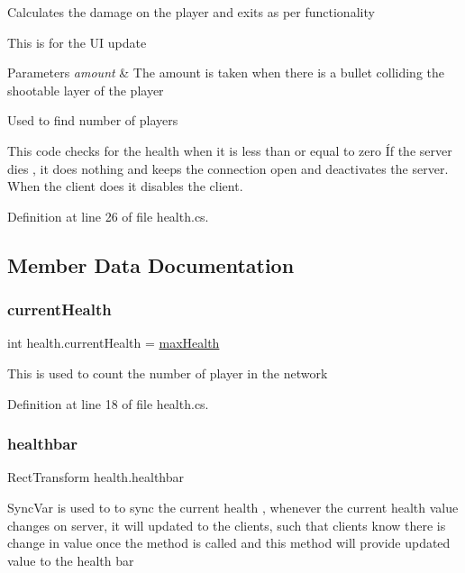 Calculates the damage on the player and exits as per functionality 

This is for the UI update 


\begin{DoxyParams}{Parameters}
{\em amount} & The amount is taken when there is a bullet colliding the shootable layer of the player\\
\hline
\end{DoxyParams}
Used to find number of players

This code checks for the health when it is less than or equal to zero Íf the server dies , it does nothing and keeps the connection open and deactivates the server. When the client does it disables the client. 

Definition at line 26 of file health.\+cs.



\subsection{Member Data Documentation}
\mbox{\label{classhealth_a50db37d3af48df3d68a1c7a415f7de53}} 
\subsubsection{\texorpdfstring{currentHealth}{currentHealth}}
{\footnotesize\ttfamily int health.\+current\+Health = \mbox{\hyperlink{classhealth_a03ad8e4011a7094e3fbec6dcd7ff946c}{max\+Health}}}

This is used to count the number of player in the network 

Definition at line 18 of file health.\+cs.

\mbox{\label{classhealth_ae6062530fe2e6cf803cab4eda97db4c9}} 
\subsubsection{\texorpdfstring{healthbar}{healthbar}}
{\footnotesize\ttfamily Rect\+Transform health.\+healthbar}

Sync\+Var is used to to sync the current health , whenever the current health value changes on server, it will updated to the clients, such that clients know there is change in value once the method is called and this method will provide updated value to the health bar 

